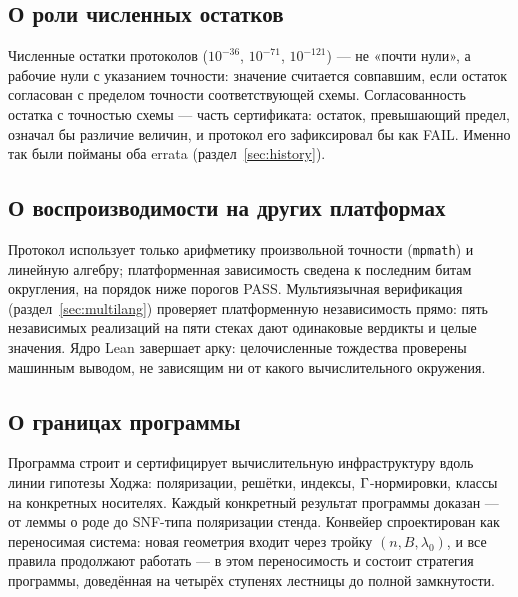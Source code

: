 \subsection{О роли численных остатков}

Численные остатки протоколов ($10^{-36}$, $10^{-71}$, $10^{-121}$)
--- не «почти нули», а рабочие нули с указанием точности: значение
считается совпавшим, если остаток согласован с пределом точности
соответствующей схемы. Согласованность остатка с точностью схемы
--- часть сертификата: остаток, превышающий предел, означал бы
различие величин, и протокол его зафиксировал бы как FAIL. Именно
так были пойманы оба errata (раздел~\ref{sec:history}).

\subsection{О воспроизводимости на других платформах}

Протокол использует только арифметику произвольной точности
(\texttt{mpmath}) и линейную алгебру; платформенная зависимость
сведена к последним битам округления, на порядок ниже порогов
PASS. Мультиязычная верификация (раздел~\ref{sec:multilang})
проверяет платформенную независимость прямо: пять независимых
реализаций на пяти стеках дают одинаковые вердикты и целые
значения. Ядро Lean завершает арку: целочисленные тождества
проверены машинным выводом, не зависящим ни от какого
вычислительного окружения.

\subsection{О границах программы}

Программа строит и сертифицирует вычислительную инфраструктуру
вдоль линии гипотезы Ходжа: поляризации, решётки, индексы,
$\Gamma$-нормировки, классы на конкретных носителях. Каждый
конкретный результат программы доказан --- от леммы о роде до
SNF-типа поляризации стенда. Конвейер спроектирован как переносимая
система: новая геометрия входит через тройку $(n,B,\lambda_0)$,
и все правила продолжают работать --- в этом переносимость и
состоит стратегия программы, доведённая на четырёх ступенях
лестницы до полной замкнутости.

